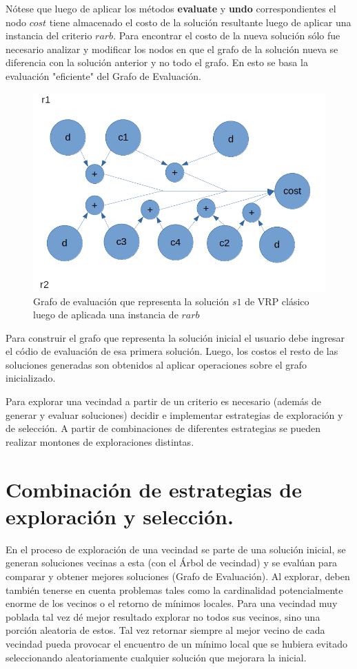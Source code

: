 Nótese que luego de aplicar los métodos \textbf{evaluate} y \textbf{undo} correspondientes el nodo $cost$ tiene almacenado el costo de la solución resultante luego de aplicar una instancia del criterio $rarb$. Para encontrar el costo de la nueva solución sólo fue necesario analizar y modificar los nodos en que el grafo de la solución nueva se diferencia con la solución anterior y no todo el grafo. En esto se basa la evaluación "eficiente" del Grafo de Evaluación.

 \begin{figure}
	\centering
	\includegraphics[width=0.9\linewidth]{Graphics/eval-graph-4}
	\caption{Grafo de evaluación que representa la solución $s1$ de VRP clásico luego de aplicada una instancia de $rarb$}
	\label{fig:eval-graph-4}
\end{figure}

Para construir el grafo que representa la solución inicial el usuario debe ingresar el códio de evaluación de esa primera solución. Luego, los costos el resto de las soluciones generadas son obtenidos al aplicar operaciones sobre el grafo inicializado.

Para explorar una vecindad a partir de un criterio es necesario (además de generar y evaluar soluciones) decidir e implementar estrategias de exploración y de selección. A partir de combinaciones de diferentes estrategias se pueden realizar montones de exploraciones distintas.


\section{Combinación de estrategias de exploración y selección.}\label{2-Heidy} 
En el proceso de exploración de una vecindad se parte de una solución inicial, se generan soluciones vecinas a esta (con el Árbol de vecindad) y se evalúan para comparar y obtener mejores soluciones (Grafo de Evaluación). Al explorar, deben también tenerse en cuenta problemas tales como la cardinalidad potencialmente enorme de los vecinos o el retorno de mínimos locales. Para una vecindad muy poblada tal vez dé mejor resultado explorar no todos sus vecinos, sino una porción aleatoria de estos. Tal vez retornar siempre al mejor vecino de cada vecindad pueda provocar el encuentro de un mínimo local que se hubiera evitado seleccionando aleatoriamente cualquier solución que mejorara la inicial.

